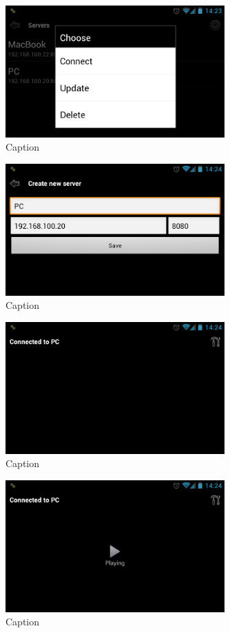 \documentclass[a4paper,12pt]{article}
\begin{document}
\begin{figure}[H]
\centering
\includegraphics[width=0.75\textwidth]{Screenshot_4.png}
\caption{Caption}
\end{figure}

\begin{figure}[H]
\centering
\includegraphics[width=0.75\textwidth]{Screenshot_5.png}
\caption{Caption}
\end{figure}

\begin{figure}[H]
\centering
\includegraphics[width=0.75\textwidth]{Screenshot_6.png}
\caption{Caption}
\end{figure}

\begin{figure}[H]
\centering
\includegraphics[width=0.75\textwidth]{Screenshot_7.png}
\caption{Caption}
\end{figure}
\end{document}
